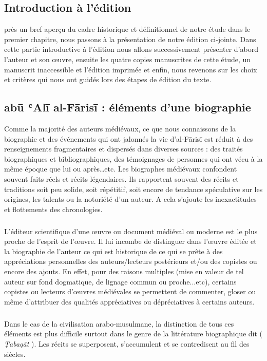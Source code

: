 \documentclass[a4paper,12pt]{report}
\begin{document}
\begin{itemize}
\chapter{	Introduction  à l’édition }


près un bref aperçu du cadre  historique et définitionnel de notre étude dans le premier chapitre, nous passons à la   présentation de notre édition ci-jointe. Dans cette partie introductive à l'édition  nous allons successivement présenter d'abord l'auteur et son œuvre, ensuite  les quatre  copies manuscrites de cette étude, un manuscrit inaccessible  et l'édition  imprimée  et enfin,  nous revenons sur les choix et critères  qui   nous ont guidés lors des étapes de    édition du texte.

\section{abū ʿAl\=i al-Fārisī : éléments d’une biographie }

Comme la majorité des auteurs médiévaux, ce que nous connaissons de la biographie et des événements qui ont jalonnés la vie d'al-Fārisī est réduit à des renseignements fragmentaires et dispersés dans diverses sources :  des traités biographiques et bibliographiques, des témoignages de personnes qui ont vécu à la même époque que lui ou après…etc. Les biographes médiévaux confondent souvent faits réels et récits légendaires. Ils rapportent souvent des récits et traditions soit peu solide, soit répétitif, soit encore de tendance spéculative sur les origines, les talents ou la notoriété d’un auteur. A cela s’ajoute les inexactitudes et flottements des chronologies.
\paragraph{}

 L'éditeur scientifique d'une œuvre ou document  médiéval ou moderne  est le plus proche de l'esprit de l'œuvre. Il lui incombe de distinguer dans l'œuvre éditée et la biographie de l'auteur ce qui est historique  de ce qui se prête à des appréciations personnelles des auteurs/lecteurs postérieurs et/ou des copistes ou encore des ajouts. En effet, pour des raisons multiples (mise en valeur de tel auteur sur fond dogmatique, de lignage commun ou proche...etc),  certains copistes ou lecteurs d'œuvres médiévales se permettent de commenter, gloser ou même d'attribuer des qualités appréciatives ou dépréciatives à certains auteurs.  
 \paragraph{}
Dans le cas de la civilisation arabo-musulmane, la distinction de tous ces éléments est plus difficile surtout dans le genre  de 
la littérature biographique dit ( \textit{Ṭabaqāt} ). Les récits se superposent,  s’accumulent et se contredisent  au fil des siècles. 


\end{itemize}
\end{document}
